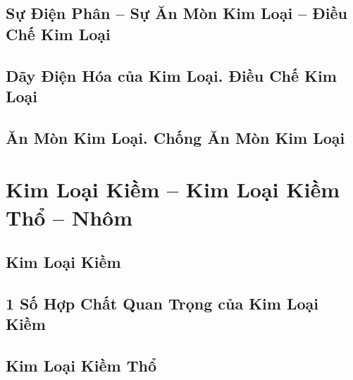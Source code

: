 \documentclass{article}
\numberwithin{equation}{section}
\begin{document}

\subsection{Sự Điện Phân -- Sự Ăn Mòn Kim Loại -- Điều Chế Kim Loại}


\subsection{Dãy Điện Hóa của Kim Loại. Điều Chế Kim Loại}


\subsection{Ăn Mòn Kim Loại. Chống Ăn Mòn Kim Loại}


\section{Kim Loại Kiềm -- Kim Loại Kiềm Thổ -- Nhôm}

\subsection{Kim Loại Kiềm}


\subsection{1 Số Hợp Chất Quan Trọng của Kim Loại Kiềm}


\subsection{Kim Loại Kiềm Thổ}

\end{document}
